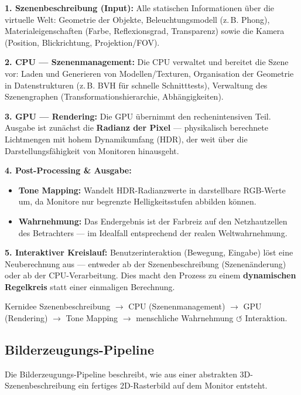 \documentclass[12pt, a4paper]{article}
\begin{document}
\textbf{1. Szenenbeschreibung (Input):} Alle statischen Informationen über die virtuelle Welt: Geometrie der Objekte, Beleuchtungsmodell (z.\,B. Phong), Materialeigenschaften (Farbe, Reflexionsgrad, Transparenz) sowie die Kamera (Position, Blickrichtung, Projektion/FOV).

\textbf{2. CPU — Szenenmanagement:} Die CPU verwaltet und bereitet die Szene vor: Laden und Generieren von Modellen/Texturen, Organisation der Geometrie in Datenstrukturen (z.\,B. BVH für schnelle Schnitttests), Verwaltung des Szenengraphen (Transformationshierarchie, Abhängigkeiten).

\textbf{3. GPU — Rendering:} Die GPU übernimmt den rechenintensiven Teil. Ausgabe ist zunächst die \textbf{Radianz der Pixel} — physikalisch berechnete Lichtmengen mit hohem Dynamikumfang (HDR), der weit über die Darstellungsfähigkeit von Monitoren hinausgeht.

\textbf{4. Post-Processing \& Ausgabe:}
\begin{itemize}
  \item \textbf{Tone Mapping:} Wandelt HDR-Radianzwerte in darstellbare RGB-Werte um, da Monitore nur begrenzte Helligkeitsstufen abbilden können.
  \item \textbf{Wahrnehmung:} Das Endergebnis ist der Farbreiz auf den Netzhautzellen des Betrachters — im Idealfall entsprechend der realen Weltwahrnehmung.
\end{itemize}

\textbf{5. Interaktiver Kreislauf:} Benutzerinteraktion (Bewegung, Eingabe) löst eine Neuberechnung aus — entweder ab der Szenenbeschreibung (Szenenänderung) oder ab der CPU-Verarbeitung. Dies macht den Prozess zu einem \textbf{dynamischen Regelkreis} statt einer einmaligen Berechnung.

\begin{notebox}{Kernidee}
Szenenbeschreibung $\to$ CPU (Szenenmanagement) $\to$ GPU (Rendering) $\to$ Tone Mapping $\to$ menschliche Wahrnehmung $\circlearrowleft$ Interaktion.
\end{notebox}

\subsection{Bilderzeugungs-Pipeline}

Die Bilderzeugungs-Pipeline beschreibt, wie aus einer abstrakten 3D-Szenenbeschreibung ein fertiges 2D-Rasterbild auf dem Monitor entsteht.
\end{document}
